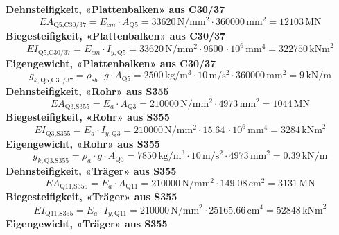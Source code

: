\documentclass[11pt,a4paper]{article}
\begin{document}
\noindent\textbf{Dehnsteifigkeit, «Plattenbalken» aus C30/37}
\begin{equation*}
EA_{\text{Q5,C30/37}} = E_{cm} \cdot A_{\text{Q5}} = 33620\,\mathrm{N}/\mathrm{mm}^{2} \cdot 360000\,\mathrm{mm}^{2} = 12103\,\mathrm{MN}
\end{equation*}
\noindent\textbf{Biegesteifigkeit, «Plattenbalken» aus C30/37}
\begin{equation*}
EI_{\text{Q5,C30/37}} = E_{cm} \cdot I_{y,\text{Q5}} = 33620\,\mathrm{N}/\mathrm{mm}^{2} \cdot 9600\,\cdot 10^{6}\,\mathrm{mm}^{4} = 322750\,\mathrm{kNm}^{2}
\end{equation*}
\noindent\textbf{Eigengewicht, «Plattenbalken» aus C30/37}
\begin{equation*}
g_{k,\text{Q5,C30/37}} = \rho_{sb} \cdot g \cdot A_{\text{Q5}} = 2500\,\mathrm{kg}/\mathrm{m}^{3} \cdot 10\,\mathrm{m}/\mathrm{s}^{2} \cdot 360000\,\mathrm{mm}^{2} = 9\,\mathrm{kN}/\mathrm{m}
\end{equation*}
\noindent\textbf{Dehnsteifigkeit, «Rohr» aus S355}
\begin{equation*}
EA_{\text{Q3,S355}} = E_a \cdot A_{\text{Q3}} = 210000\,\mathrm{N}/\mathrm{mm}^{2} \cdot 4973\,\mathrm{mm}^{2} = 1044\,\mathrm{MN}
\end{equation*}
\noindent\textbf{Biegesteifigkeit, «Rohr» aus S355}
\begin{equation*}
EI_{\text{Q3,S355}} = E_a \cdot I_{y,\text{Q3}} = 210000\,\mathrm{N}/\mathrm{mm}^{2} \cdot 15.64\,\cdot 10^{6}\,\mathrm{mm}^{4} = 3284\,\mathrm{kNm}^{2}
\end{equation*}
\noindent\textbf{Eigengewicht, «Rohr» aus S355}
\begin{equation*}
g_{k,\text{Q3,S355}} = \rho_a \cdot g \cdot A_{\text{Q3}} = 7850\,\mathrm{kg}/\mathrm{m}^{3} \cdot 10\,\mathrm{m}/\mathrm{s}^{2} \cdot 4973\,\mathrm{mm}^{2} = 0.39\,\mathrm{kN}/\mathrm{m}
\end{equation*}
\noindent\textbf{Dehnsteifigkeit, «Träger» aus S355}
\begin{equation*}
EA_{\text{Q11,S355}} = E_a \cdot A_{\text{Q11}} = 210000\,\mathrm{N}/\mathrm{mm}^{2} \cdot 149.08\,\mathrm{cm}^{2} = 3131\,\mathrm{MN}
\end{equation*}
\noindent\textbf{Biegesteifigkeit, «Träger» aus S355}
\begin{equation*}
EI_{\text{Q11,S355}} = E_a \cdot I_{y,\text{Q11}} = 210000\,\mathrm{N}/\mathrm{mm}^{2} \cdot 25165.66\,\mathrm{cm}^{4} = 52848\,\mathrm{kNm}^{2}
\end{equation*}
\noindent\textbf{Eigengewicht, «Träger» aus S355}
\end{document}
